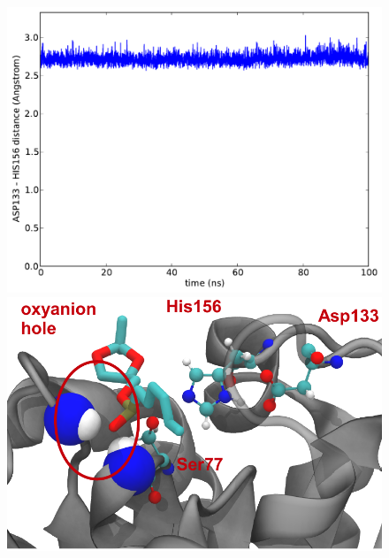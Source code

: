 \documentclass[english]{beamer}
\begin{document}
\begin{frame}
\begin{figure}
    \hspace{0.5cm}
        \begin{minipage}[t]{0.45\linewidth}
            \centering
            \includegraphics[width=1.0\textwidth]{figures/BSLA_solo/BSLA_solo_dist_ASP133_HIS156.pdf} 
            \linebreak
            \includegraphics[width=1.0\textwidth]{figures/BSLA_pocket/BSLA_pocket_cartoon.pdf}
        \end{minipage}
    \end{figure}  

\end{frame}    

\end{document}
